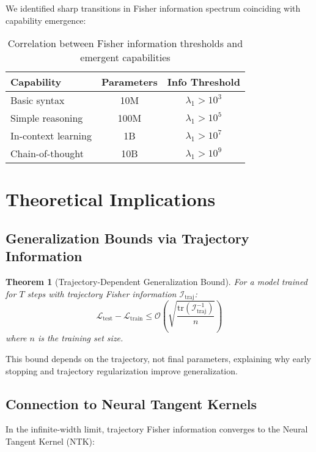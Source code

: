 \documentclass[11pt]{article}
\newtheorem{theorem}{Theorem}
\begin{document}
We identified sharp transitions in Fisher information spectrum coinciding with capability emergence:

\begin{table}[h]
\centering
\begin{tabular}{lcc}
\toprule
\textbf{Capability} & \textbf{Parameters} & \textbf{Info Threshold} \\
\midrule
Basic syntax & 10M & $\lambda_1 > 10^3$ \\
Simple reasoning & 100M & $\lambda_1 > 10^5$ \\
In-context learning & 1B & $\lambda_1 > 10^7$ \\
Chain-of-thought & 10B & $\lambda_1 > 10^9$ \\
\bottomrule
\end{tabular}
\caption{Correlation between Fisher information thresholds and emergent capabilities}
\end{table}

\section{Theoretical Implications}

\subsection{Generalization Bounds via Trajectory Information}

\begin{theorem}[Trajectory-Dependent Generalization Bound]
For a model trained for $T$ steps with trajectory Fisher information $\mathcal{I}_{\text{traj}}$:
\begin{equation}
\mathcal{L}_{\text{test}} - \mathcal{L}_{\text{train}} \leq \mathcal{O}\left(\sqrt{\frac{\text{tr}(\mathcal{I}_{\text{traj}}^{-1})}{n}}\right)
\end{equation}
where $n$ is the training set size.
\end{theorem}

This bound depends on the trajectory, not final parameters, explaining why early stopping and trajectory regularization improve generalization.

\subsection{Connection to Neural Tangent Kernels}

In the infinite-width limit, trajectory Fisher information converges to the Neural Tangent Kernel (NTK):
\end{document}
